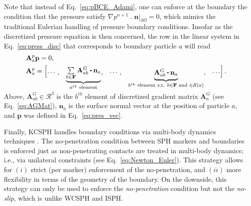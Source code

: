 Note that instead of Eq.~\ref{eq:pBCE_Adami}, one can enforce at the boundary the condition that the pressure satisfy $\nabla p^{n+1}\;.\;\mathbf{n}|_{\partial \Omega}=0$, which mimics the traditional Eulerian handling of pressure boundary conditions. Insofar as the discretized pressure equation is then concerned, the row in the linear system in Eq.~\ref{eq:press_disc} that corresponds to boundary particle $a$ will read
\begin{align*}\renewcommand{\arraystretch}{1.2}
&\mathbf{A}^{p}_a \mathbf{p}=  0,  \\
&\mathbf{A}^{p}_a= \begin{bmatrix}
\cdots, & 
\smash[b]{\underbrace{\begin{matrix}{\sum\limits_{b \in \mathbf{F}} \mathbf{A}^G_{ab} \bigcdot  \mathbf{n}_a } \end{matrix}}_{a^{th}\text{ element}}} ,
&\cdots, &\smash[b]{\underbrace{\begin{matrix} \mathbf{A}^G_{ab} \bigcdot  \mathbf{n}_a \end{matrix}}_{b^{th}\text{ element s.t. }{b \in \mathbf{F} \text{ and } \in \support{a}} }}, & \cdots
\end{bmatrix}.
\end{align*}\\
Above, $\mathbf{A}^G_{ab} \in \mathcal{R}^3$ is the $b^{th}$ element of discretized gradient matrix $\mathbf{A}^G_a$ (see Eq.~\ref{eq:AGMat}), $\mathbf{n}_a$ is the surface normal vector at the position of particle $a$, and $\mathbf{p}$ was defined in Eq.~\ref{eq:pres_vec}. 


Finally, KCSPH handles boundary conditions via multi-body dynamics techniques \cite{hammadConstrFluid2018}. The no-penetration condition between SPH markers and boundaries is enforced just as non-penetrating contacts are treated in multi-body dynamics; i.e., via unilateral constraints (see Eq.~\ref{eq:Newton_Euler}). This strategy allows for $(i)$ strict (per marker) enforcement of the no-penetration, and $(ii)$ more flexibility in terms of the geometry of the boundary. On the downside, this strategy can only be used to enforce the \textit{no-penetration} condition but not the \textit{no-slip}, which is unlike WCSPH and ISPH.

